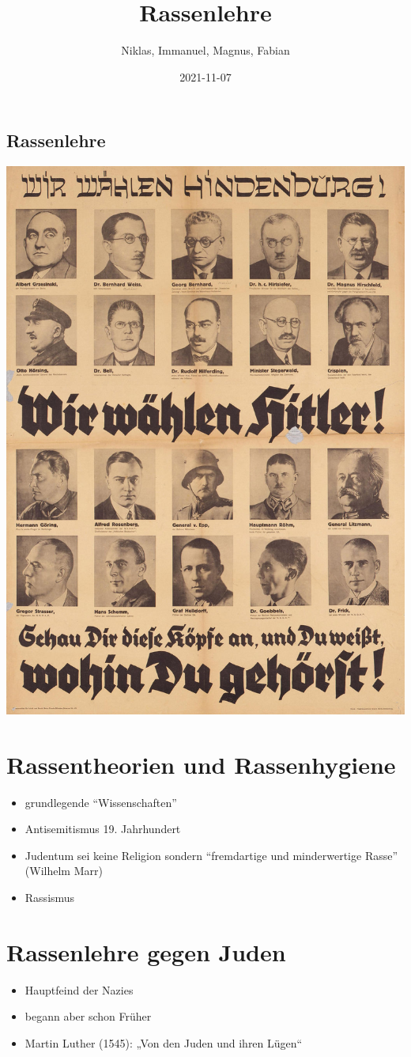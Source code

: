 \documentclass[11pt]{article}
\author{Niklas, Immanuel, Magnus, Fabian}
\date{2021-11-07}
\title{Rassenlehre}
\begin{document}
\maketitle
\tableofcontents

\newpage
\begin{center}

\section{Rassenlehre}
\label{sec:orgc58e441}
\begin{center}
\includegraphics[width=.9\linewidth]{./rassenlehre.jpg}
\end{center}
\end{center}
\newpage
\section{Rassentheorien und Rassenhygiene}
\label{sec:org4a3f88c}
\begin{itemize}
\item grundlegende "`Wissenschaften"'
\item Antisemitismus 19. Jahrhundert
\item Judentum sei keine Religion sondern "`fremdartige und minderwertige Rasse"' (Wilhelm Marr)
\item Rassismus
\end{itemize}

\section{Rassenlehre gegen Juden}
\label{sec:org2d17a90}
\begin{itemize}
\item Hauptfeind der Nazies
\item begann aber schon Früher
\item Martin Luther (1545):  „Von den Juden und ihren Lügen“
\end{itemize}
\end{document}
